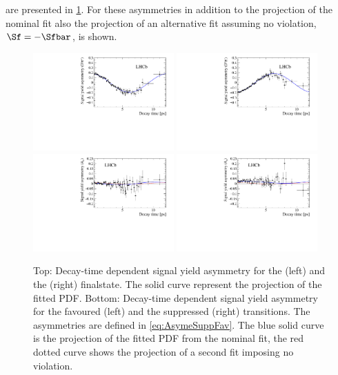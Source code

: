 are presented in \cref{fig:AsymProjection}.
For these asymmetries in addition to the projection of the nominal fit also the projection of an alternative fit assuming no \CP violation, \ie $\Sf=-\Sfbar$, is shown.
\begin{figure}[tbp]
    \centering
    \includegraphics[width=0.48\textwidth]{09TimeFit/figs/Asym_f.pdf}
    \includegraphics[width=0.48\textwidth]{09TimeFit/figs/Asym_fbar.pdf}\\
    \includegraphics[width=0.48\textwidth]{09TimeFit/figs/Asym_favour.pdf}
    \includegraphics[width=0.48\textwidth]{09TimeFit/figs/Asym_suppress.pdf}
    \caption{Top: Decay-time dependent signal yield asymmetry for the \Dm\pip (left) and the \Dp\pim (right) finalstate.
    The solid curve represent the projection of the fitted PDF.
    Bottom: Decay-time dependent signal yield asymmetry for the favoured (left) and the suppressed (right) transitions.
    The asymmetries are defined in \cref{eq:AsymeSuppFav}.
    The blue solid curve is the projection of the fitted PDF from the nominal fit, the red dotted curve shows the projection of a second fit imposing no \CP violation.}
    \label{fig:AsymProjection}
\end{figure}

